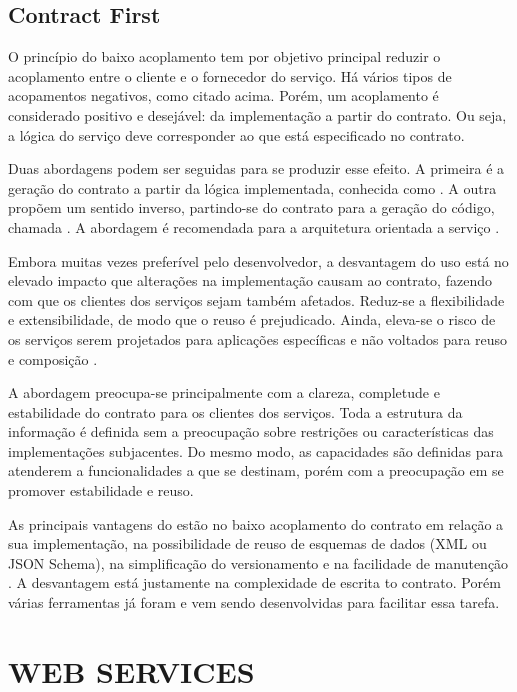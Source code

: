 \subsection{Contract First}
\vspace{-6mm}

O princípio do baixo acoplamento tem por objetivo principal reduzir o
acoplamento entre o cliente e o fornecedor do serviço. Há vários tipos de
acopamentos negativos, como citado acima. Porém, um acoplamento é considerado
positivo e desejável: da implementação a partir do contrato. Ou seja, a lógica
do serviço deve corresponder ao que está especificado no contrato.

Duas abordagens podem ser seguidas para se produzir esse efeito. A primeira é a
geração do contrato a partir da lógica implementada, conhecida como
\CdFirst{}. A outra propõem um sentido inverso, partindo-se do contrato
para a geração do código, chamada \CtFirst{}. A abordagem
\CtFirst{} é recomendada para a arquitetura orientada a serviço
\cite{erl2009web}.

Embora muitas vezes preferível pelo desenvolvedor, a desvantagem do uso
\CdFirst{} está no elevado impacto que alterações na implementação causam ao
contrato, fazendo com que os clientes dos serviços sejam também afetados.
Reduz-se a flexibilidade e extensibilidade, de modo que o reuso é prejudicado. Ainda,
eleva-se o risco de os serviços serem projetados para aplicações específicas e
não voltados para reuso e composição \cite{karthikeyancontract}.

A abordagem \CtFirst{} preocupa-se principalmente com a clareza, completude e
estabilidade do contrato para os clientes dos serviços. Toda a
estrutura da informação é definida sem a preocupação sobre restrições ou
características das implementações subjacentes. Do mesmo modo, as
capacidades são definidas para atenderem a funcionalidades a que se destinam,
porém com a preocupação em se promover estabilidade e reuso.

As principais vantagens do \CtFirst{} estão no baixo acoplamento do contrato em
relação a sua implementação, na possibilidade de reuso de esquemas de dados (XML
ou JSON Schema), na simplificação do versionamento e na facilidade de manutenção
\cite{karthikeyancontract}. A desvantagem está justamente na complexidade de
escrita to contrato. Porém várias ferramentas já foram e vem sendo desenvolvidas
para facilitar essa tarefa.


\section{WEB SERVICES}
\vspace{-6mm}

